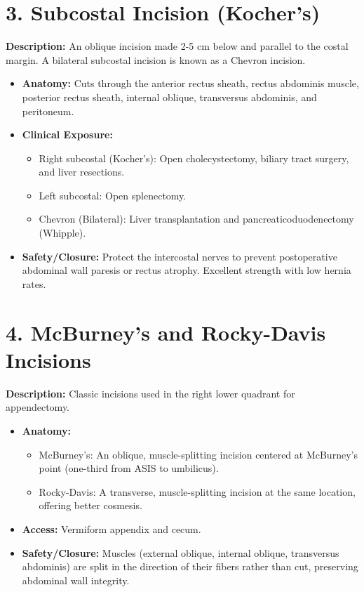 \section*{3. Subcostal Incision (Kocher's)}
\textbf{Description:} An oblique incision made 2-5 cm below and parallel to the costal margin. A bilateral subcostal incision is known as a Chevron incision.
\begin{itemize}
  \item \textbf{Anatomy:} Cuts through the anterior rectus sheath, rectus abdominis muscle, posterior rectus sheath, internal oblique, transversus abdominis, and peritoneum.
  \item \textbf{Clinical Exposure:} 
  \begin{itemize}
    \item Right subcostal (Kocher's): Open cholecystectomy, biliary tract surgery, and liver resections.
    \item Left subcostal: Open splenectomy.
    \item Chevron (Bilateral): Liver transplantation and pancreaticoduodenectomy (Whipple).
  \end{itemize}
  \item \textbf{Safety/Closure:} Protect the intercostal nerves to prevent postoperative abdominal wall paresis or rectus atrophy. Excellent strength with low hernia rates.
\end{itemize}

\section*{4. McBurney's and Rocky-Davis Incisions}
\textbf{Description:} Classic incisions used in the right lower quadrant for appendectomy.
\begin{itemize}
  \item \textbf{Anatomy:} 
  \begin{itemize}
    \item McBurney's: An oblique, muscle-splitting incision centered at McBurney's point (one-third from ASIS to umbilicus).
    \item Rocky-Davis: A transverse, muscle-splitting incision at the same location, offering better cosmesis.
  \end{itemize}
  \item \textbf{Access:} Vermiform appendix and cecum.
  \item \textbf{Safety/Closure:} Muscles (external oblique, internal oblique, transversus abdominis) are split in the direction of their fibers rather than cut, preserving abdominal wall integrity.
\end{itemize}

